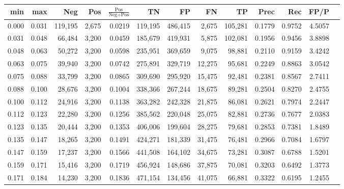 \begin{tabular}{rrrrrrrrrrrrr}
\toprule
  min &   max &     Neg &   Pos & $\frac{\text{Pos}}{\text{Neg}+\text{Pos}}$ &      TN &      FP &      FN &      TP &   Prec &    Rec &   FP/P \\
\midrule
0.000 & 0.031 & 119,195 & 2,675 &                                     0.0219 & 119,195 & 486,415 &   2,675 & 105,281 & 0.1779 & 0.9752 & 4.5057 \\
0.031 & 0.048 &  66,484 & 3,200 &                                     0.0459 & 185,679 & 419,931 &   5,875 & 102,081 & 0.1956 & 0.9456 & 3.8898 \\
0.048 & 0.063 &  50,272 & 3,200 &                                     0.0598 & 235,951 & 369,659 &   9,075 &  98,881 & 0.2110 & 0.9159 & 3.4242 \\
0.063 & 0.075 &  39,940 & 3,200 &                                     0.0742 & 275,891 & 329,719 &  12,275 &  95,681 & 0.2249 & 0.8863 & 3.0542 \\
0.075 & 0.088 &  33,799 & 3,200 &                                     0.0865 & 309,690 & 295,920 &  15,475 &  92,481 & 0.2381 & 0.8567 & 2.7411 \\
0.088 & 0.100 &  28,676 & 3,200 &                                     0.1004 & 338,366 & 267,244 &  18,675 &  89,281 & 0.2504 & 0.8270 & 2.4755 \\
0.100 & 0.112 &  24,916 & 3,200 &                                     0.1138 & 363,282 & 242,328 &  21,875 &  86,081 & 0.2621 & 0.7974 & 2.2447 \\
0.112 & 0.123 &  22,280 & 3,200 &                                     0.1256 & 385,562 & 220,048 &  25,075 &  82,881 & 0.2736 & 0.7677 & 2.0383 \\
0.123 & 0.135 &  20,444 & 3,200 &                                     0.1353 & 406,006 & 199,604 &  28,275 &  79,681 & 0.2853 & 0.7381 & 1.8489 \\
0.135 & 0.147 &  18,265 & 3,200 &                                     0.1491 & 424,271 & 181,339 &  31,475 &  76,481 & 0.2966 & 0.7084 & 1.6797 \\
0.147 & 0.159 &  17,237 & 3,200 &                                     0.1566 & 441,508 & 164,102 &  34,675 &  73,281 & 0.3087 & 0.6788 & 1.5201 \\
0.159 & 0.171 &  15,416 & 3,200 &                                     0.1719 & 456,924 & 148,686 &  37,875 &  70,081 & 0.3203 & 0.6492 & 1.3773 \\
0.171 & 0.184 &  14,230 & 3,200 &                                     0.1836 & 471,154 & 134,456 &  41,075 &  66,881 & 0.3322 & 0.6195 & 1.2455 \\

\end{tabular}
